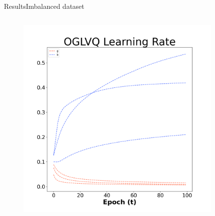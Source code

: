 \documentclass[
	aspectratio=169,	%
	onlytextwidth,		%
	t,					%
	]{beamer}
\begin{document}
\begin{frame}[fragile]{Results}{Imbalanced dataset}
\begin{columns}
			\begin{column}[T]{0.33\textwidth}
				\begin{figure}
					\includegraphics[width=0.9\textwidth]{myfigs/OGLVQ_i.png}
				\end{figure}
			\end{column}
			
			
		\end{columns}
		
		\centering		\color{red}{Be careful with y-axis, since they do not share common size}
		
	\end{frame}
	
\end{document}
